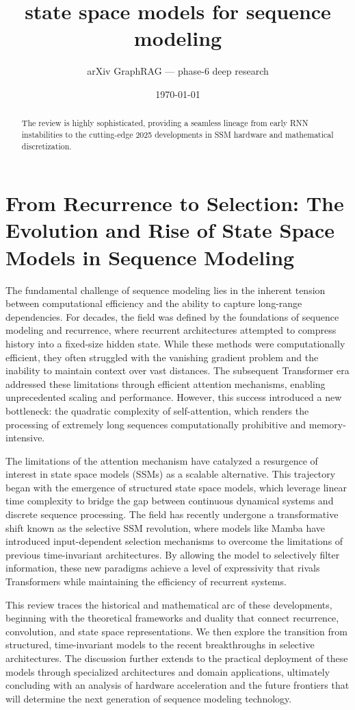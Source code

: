 \documentclass[11pt]{article}
\title{state space models for sequence modeling}
\author{arXiv GraphRAG --- phase-6 deep research}
\date{\today}
\begin{document}
\maketitle

\begin{abstract}
The review is highly sophisticated, providing a seamless lineage from early RNN instabilities to the cutting-edge 2025 developments in SSM hardware and mathematical discretization.
\end{abstract}

\section{From Recurrence to Selection: The Evolution and Rise of State Space Models in Sequence Modeling}

The fundamental challenge of sequence modeling lies in the inherent tension between computational efficiency and the ability to capture long-range dependencies. For decades, the field was defined by the foundations of sequence modeling and recurrence, where recurrent architectures attempted to compress history into a fixed-size hidden state. While these methods were computationally efficient, they often struggled with the vanishing gradient problem and the inability to maintain context over vast distances. The subsequent Transformer era addressed these limitations through efficient attention mechanisms, enabling unprecedented scaling and performance. However, this success introduced a new bottleneck: the quadratic complexity of self-attention, which renders the processing of extremely long sequences computationally prohibitive and memory-intensive.

The limitations of the attention mechanism have catalyzed a resurgence of interest in state space models (SSMs) as a scalable alternative. This trajectory began with the emergence of structured state space models, which leverage linear time complexity to bridge the gap between continuous dynamical systems and discrete sequence processing. The field has recently undergone a transformative shift known as the selective SSM revolution, where models like Mamba have introduced input-dependent selection mechanisms to overcome the limitations of previous time-invariant architectures. By allowing the model to selectively filter information, these new paradigms achieve a level of expressivity that rivals Transformers while maintaining the efficiency of recurrent systems.

This review traces the historical and mathematical arc of these developments, beginning with the theoretical frameworks and duality that connect recurrence, convolution, and state space representations. We then explore the transition from structured, time-invariant models to the recent breakthroughs in selective architectures. The discussion further extends to the practical deployment of these models through specialized architectures and domain applications, ultimately concluding with an analysis of hardware acceleration and the future frontiers that will determine the next generation of sequence modeling technology.
\end{document}
